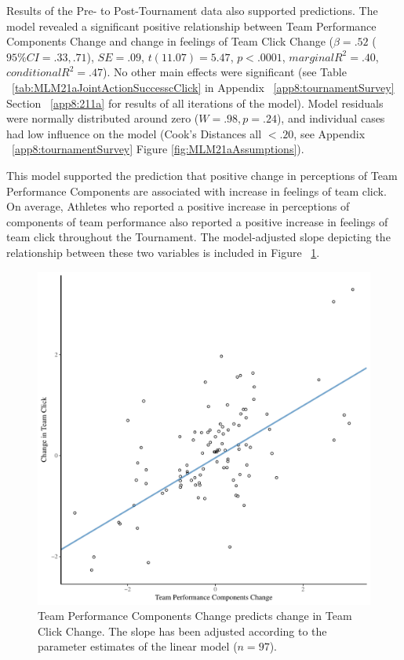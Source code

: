 \begin{CJK}{UTF8}{gbsn}
Results of the Pre- to Post-Tournament data also supported predictions.  The model revealed a significant positive relationship between Team Performance Components Change and change in feelings of Team Click Change ($\beta = .52$ ($95\% CI =  .33, .71$), $SE = .09$, $t(11.07) = 5.47$, $p < .0001$, $marginal R^2 = .40$, $conditional R^2 = .47$).  No other main effects were significant (see Table ~\ref{tab:MLM21aJointActionSuccesscClick} in Appendix ~\ref{app8:tournamentSurvey} Section ~\ref{app8:211a} for results of all iterations of the model).  Model residuals were normally distributed around zero ($W = .98, p = .24$), and individual cases had low influence on the model (Cook's Distances all  $< .20 $, see Appendix ~\ref{app8:tournamentSurvey} Figure \ref{fig:MLM21aAssumptions}).

This model supported the prediction that positive change in perceptions of Team Performance Components are associated with increase in feelings of team click.  On average, Athletes who reported a positive increase in perceptions of components of team performance also reported a positive increase in feelings of team click throughout the Tournament.  The model-adjusted slope depicting the relationship between these two variables is included in Figure ~\ref{fig:jasClickDeltaModelSLope}.

\begin{figure}[htbp]
  \centering
\includegraphics[scale=.5]{images/jasClickDeltaModelSlope}
  \caption{Team Performance Components Change predicts change in Team Click Change. The slope has been adjusted according to the parameter estimates of the linear model ($n = 97$).}
  \label{fig:jasClickDeltaModelSLope}
\end{figure}


\end{CJK}
